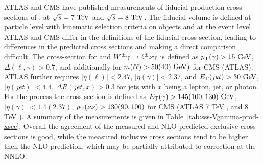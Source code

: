 ATLAS and CMS have published measurements of fiducial production cross sections of
\Wglvg, \Zgllg at $\rts=7\TeV$ and $\rts=8\TeV$. 
The fiducial volume is defined at particle level with kinematic selection criteria 
on objects and at the event level. ATLAS and CMS differ in the definitions 
of the fiducial cross section, leading to differences in the predicted cross sections
and making a direct comparison difficult. 
The cross-section for \Zgllg\; and $W^{\pm}\gamma \rightarrow \ell^\pm \nu \gamma $ is defined as 
$\pt(\gamma)>15\GeV$,$\Delta(\ell,\gamma)>0.7$, and additionally for \Zg\; $m(\ell\ell)>50 (40) \GeV)$ 
for CMS (ATLAS). ATLAS further requires $|\eta(\ell)|<2.47$,  $|\eta(\gamma)|<2.37$, and 
$\ET(jet) >30\GeV$, $|\eta(jet)|<4.4$, $\Delta R (jet,x) > 0.3$ for jets with $x$ being a lepton, jet, or photon. 
For the \Zgvvg\; process the cross section is defined as $\ET(\gamma)>145 (100, 130)\GeV$, 
$|\eta(\gamma)|<1.4(2.37)$, $p_{\mathrm{T}}(\nu\nu)>130(90, 100)$ for CMS (ATLAS 7 TeV \cite{Chatrchyan:2013nda}, and 8 TeV \cite{Aad:2016sau}).
A summary of the measurements is given in Table~\ref{tab:sss-Vgamma-prod-xsec}. Overall the agreement
of the measured and NLO predicted exclusive cross sections is good, while the measured inclusive cross sections tend to be
higher then the NLO prediction, which may be partially attributed to correction at the NNLO.


